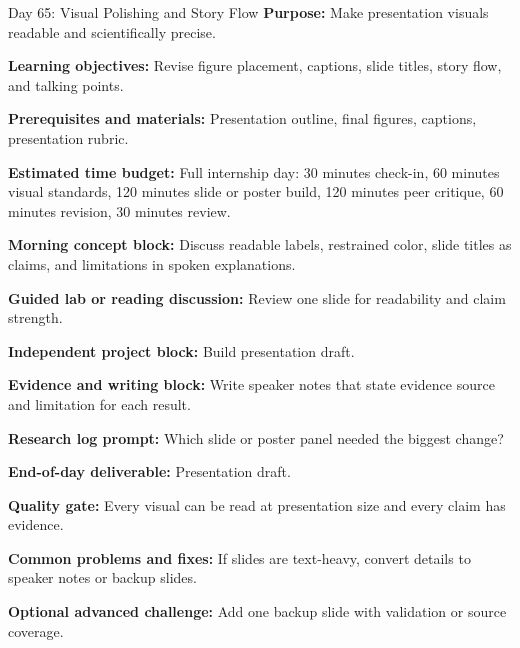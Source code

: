 \begin{dailybox}{Day 65: Visual Polishing and Story Flow}
\textbf{Purpose:} Make presentation visuals readable and scientifically precise.

\textbf{Learning objectives:} Revise figure placement, captions, slide titles, story flow, and talking points.

\textbf{Prerequisites and materials:} Presentation outline, final figures, captions, presentation rubric.

\textbf{Estimated time budget:} Full internship day: 30 minutes check-in, 60 minutes visual standards, 120 minutes slide or poster build, 120 minutes peer critique, 60 minutes revision, 30 minutes review.

\textbf{Morning concept block:} Discuss readable labels, restrained color, slide titles as claims, and limitations in spoken explanations.

\textbf{Guided lab or reading discussion:} Review one slide for readability and claim strength.

\textbf{Independent project block:} Build presentation draft.

\textbf{Evidence and writing block:} Write speaker notes that state evidence source and limitation for each result.

\textbf{Research log prompt:} Which slide or poster panel needed the biggest change?

\textbf{End-of-day deliverable:} Presentation draft.

\textbf{Quality gate:} Every visual can be read at presentation size and every claim has evidence.

\textbf{Common problems and fixes:} If slides are text-heavy, convert details to speaker notes or backup slides.

\textbf{Optional advanced challenge:} Add one backup slide with validation or source coverage.
\end{dailybox}

